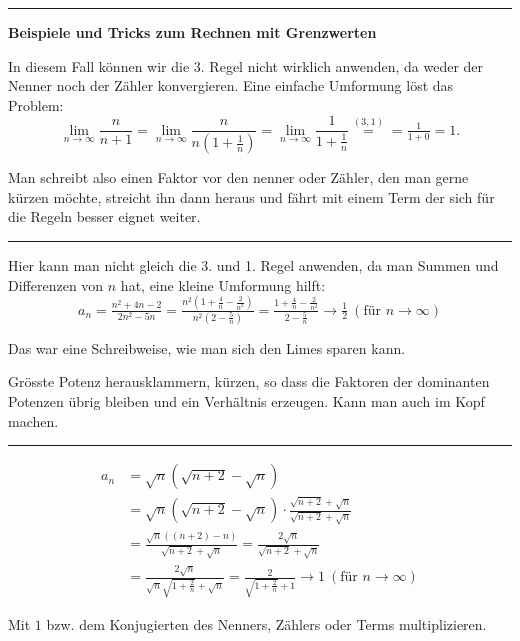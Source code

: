 \documentclass[a4paper,landscape,8pt]{extarticle}
\newcommand{\sep}{\vspace{5pt}\noindent\hrule\vspace{5pt}}
\begin{document}
\begin{multicols*}{4}
\sep

\begin{warmup}
\textbf{Beispiele und Tricks zum Rechnen mit Grenzwerten}

\Bsp In diesem Fall können wir die 3. Regel nicht wirklich anwenden, da
weder der Nenner noch der Zähler konvergieren. Eine einfache Umformung löst das
Problem:
\[
\lim_{n\to\infty} \frac{n}{n+1}
= \lim_{n\to\infty} \frac{n}{n(1+\frac{1}{n})}
= \lim_{n\to\infty} \frac{1}{1+\frac{1}{n}}
\stackrel{(3,1)}{=} = \tfrac{1}{1+0} = 1.
\]
\end{warmup}

\Trick Man schreibt also einen Faktor vor den nenner oder Zähler, den man gerne
kürzen möchte, streicht ihn dann heraus und fährt mit einem Term der sich für
die Regeln besser eignet weiter.

\begin{warmup}
\sep


\Bsp Hier kann man nicht gleich die 3. und 1. Regel anwenden, da man Summen und
Differenzen von $n$ hat, eine kleine Umformung hilft:
\[
a_n=\tfrac{n^2+4n-2}{2n^2-5n}
=\tfrac{n^2(1+\frac{4}{n}-\frac{2}{n^2})}{n^2(2 -\frac{5}{n})}
=\tfrac{1+\frac{4}{n}-\frac{2}{n^2}}{2 -\frac{5}{n}}
\to \tfrac{1}{2} \ (\text{für } n\to\infty)
\]
\end{warmup}

\Trick Das war eine Schreibweise, wie man sich den Limes sparen kann.

\Trick Grösste Potenz herausklammern, kürzen, so dass die Faktoren der
dominanten Potenzen übrig bleiben und ein Verhältnis erzeugen. Kann man auch im
Kopf machen.

\begin{warmup}
\sep

\Bsp 
\begin{align*}
a_n &= \sqrt{n}(\sqrt{n+2}-\sqrt{n})\\
&=\sqrt{n}(\sqrt{n+2}-\sqrt{n}) \cdot
\frac{\sqrt{n+2}+\sqrt{n}}{\sqrt{n+2}+\sqrt{n}}\\
&= \frac{\sqrt{n}((n+2)-n)}{\sqrt{n+2}+\sqrt{n}}
= \frac{2\sqrt{n}}{\sqrt{n+2}+\sqrt{n}}\\
&= \frac{2\sqrt{n}}{\sqrt{n}\sqrt{1+\frac{2}{n}}+\sqrt{n}}
= \frac{2}{\sqrt{1+\frac{2}{n}}+1} \to 1 \ (\text{für }
n\to\infty)
\end{align*}
\end{warmup}

\Trick Mit $1$ bzw. dem Konjugierten
des Nenners, Zählers oder Terms multiplizieren.


\end{multicols*}
\end{document}
